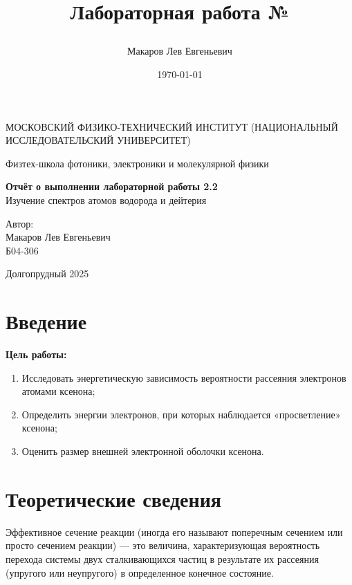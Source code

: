 \documentclass[a4paper,12pt]{article}
\author{Макаров Лев Евгеньевич}
\title{Лабораторная работа №\labnumber

\labname
}
\date{\today}
\newcommand\labname{Изучение спектров атомов водорода и дейтерия}
\newcommand\labnumber{2.2}
\begin{document}
\begin{titlepage}
	\begin{center}
		{\large МОСКОВСКИЙ ФИЗИКО-ТЕХНИЧЕСКИЙ ИНСТИТУТ (НАЦИОНАЛЬНЫЙ ИССЛЕДОВАТЕЛЬСКИЙ УНИВЕРСИТЕТ)}
	\end{center}
	\begin{center}
		{\large Физтех-школа фотоники, электроники и молекулярной физики}
	\end{center}
	
	
	\vspace{4.5cm}
	{\huge
		\begin{center}
			{\bf Отчёт о выполнении лабораторной работы \labnumber}\\
			\labname
		\end{center}
	}
	\vspace{2cm}
	\begin{flushright}
		{\LARGE Автор:\\ Макаров Лев Евгеньевич \\
			\vspace{0.2cm}
			Б04-306}
	\end{flushright}
	\vspace{8cm}
	\begin{center}
		Долгопрудный 2025
	\end{center}
\end{titlepage}

\section{Введение}

\textbf{Цель работы:} 
\begin{enumerate}
	\item Исследовать энергетическую зависимость вероятности рассеяния электронов атомами ксенона;
    \item Определить энергии электронов, при которых наблюдается «просветление» ксенона;
    \item Оценить размер внешней электронной оболочки ксенона.
\end{enumerate}

\section{Теоретические сведения}

Эффективное сечение реакции (иногда его называют поперечным сечением или просто сечением реакции) — это величина, характеризующая вероятность перехода системы двух сталкивающихся частиц в результате их рассеяния (упругого или неупругого) в определенное конечное состояние.
\end{document}
